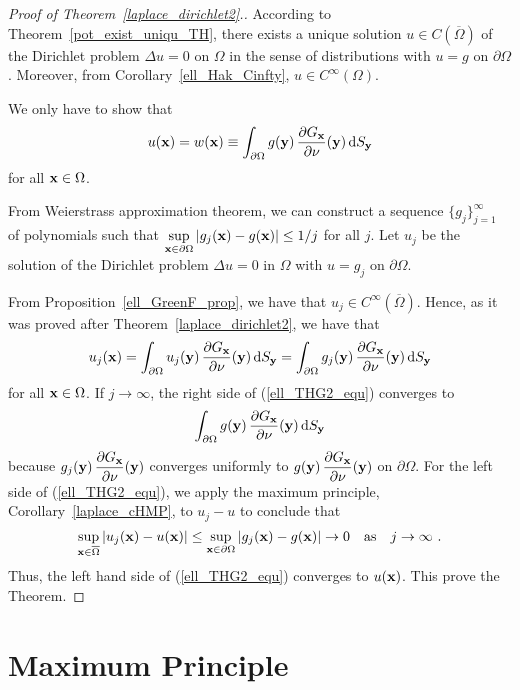 \begin{proof}[Proof of Theorem~\ref{laplace_dirichlet2}.]
According to Theorem~\ref{pot_exist_uniqu_TH}, there exists a unique
solution $u \in C(\overline{\Omega})$ of the Dirichlet problem
$\Delta u = 0$ on $\Omega$ in the sense of distributions with $u=g$
on $\partial \Omega$.
Moreover, from Corollary~\ref{ell_Hak_Cinfty},
$\displaystyle u \in C^\infty(\Omega)$.

We only have to show that
\[
u(\mathbf{x}) = w(\mathbf{x}) \equiv \int_{\partial \Omega} g(\mathbf{y})\,
\frac{\partial{G_{\mathbf{x}}}}{\partial \mathbf{\nu}}(\mathbf{y})\,\mathrm{d}{S}_{\mathbf{y}}
\]
for all $\mathbf{x} \in \Omega$.

From Weierstrass approximation theorem, we can construct a sequence
$\displaystyle \{ g_j\}_{j=1}^\infty$ of polynomials such that
$\displaystyle \sup_{\mathbf{x} \in \partial \Omega}
|g_j(\mathbf{x}) - g(\mathbf{x})| \leq 1/j$ for all $j$.
Let $u_j$ be the solution of the Dirichlet problem
$\Delta u = 0$ in $\Omega$ with $u=g_j$ on $\partial \Omega$.

From Proposition~\ref{ell_GreenF_prop}, we have that
$\displaystyle u_j \in C^\infty(\overline{\Omega})$.  Hence, as it was
proved after Theorem~\ref{laplace_dirichlet2}, we have that
\begin{equation} \label{ell_THG2_equ}
u_j(\mathbf{x}) = \int_{\partial \Omega} u_j(\mathbf{y})\,
\frac{\partial{G_{\mathbf{x}}}}{\partial \mathbf{\nu}}(\mathbf{y})\,\mathrm{d}{S}_{\mathbf{y}}
= \int_{\partial \Omega} g_j(\mathbf{y})\,
\frac{\partial{G_{\mathbf{x}}}}{\partial \mathbf{\nu}}(\mathbf{y})\,\mathrm{d}{S}_{\mathbf{y}}
\end{equation}
for all $\displaystyle \mathbf{x} \in \Omega$.
If $j \rightarrow \infty$, the right side of (\ref{ell_THG2_equ})
converges to
\[
\int_{\partial \Omega} g(\mathbf{y})\,
\frac{\partial{G_{\mathbf{x}}}}{\partial \mathbf{\nu}}(\mathbf{y})\,\mathrm{d}{S}_{\mathbf{y}}
\]
because $\displaystyle g_j(\mathbf{y})\,\frac{\partial{G_{\mathbf{x}}}}{\partial \mathbf{\nu}}(\mathbf{y})$
converges uniformly to $\displaystyle g(\mathbf{y})\,
\frac{\partial{G_{\mathbf{x}}}}{\partial \mathbf{\nu}}(\mathbf{y})$ on $\partial \Omega$.
For the left side of (\ref{ell_THG2_equ}), we apply the maximum
principle, Corollary~\ref{laplace_cHMP}, to $u_j-u$ to conclude that
\[
\sup_{\mathbf{x}\in \overline{\Omega}} |u_j(\mathbf{x}) - u(\mathbf{x})| \leq
\sup_{\mathbf{x}\in \partial \Omega} |g_j(\mathbf{x}) - g(\mathbf{x})|
\rightarrow 0
\quad \text{as} \quad j \rightarrow \infty \ .
\]
Thus, the left hand side of (\ref{ell_THG2_equ}) converges to
$u(\mathbf{x})$.  This prove the Theorem.
\end{proof}

\section{Maximum Principle}

